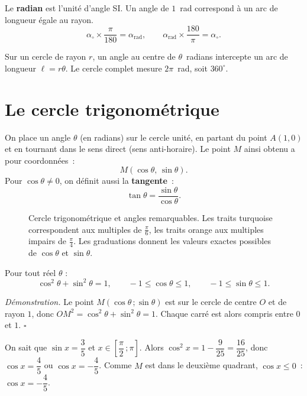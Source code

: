 \begin{defn}[Radian]
Le \textbf{radian} est l'unit\'e d'angle SI. Un angle de $1$~rad correspond
\`a un arc de longueur \'egale au rayon.
$$\alpha_\circ \times \frac{\pi}{180} = \alpha_\text{rad},\qquad
  \alpha_\text{rad} \times \frac{180}{\pi} = \alpha_\circ.$$
\end{defn}

\begin{remarque}
Sur un cercle de rayon $r$, un angle au centre de $\theta$~radians intercepte un
arc de longueur $\ell=r\theta$. Le cercle complet mesure $2\pi$~rad, soit $360^{\circ}$.
\end{remarque}

\section{Le cercle trigonom\'etrique}

\begin{defn}
On place un angle $\theta$ (en radians) sur le cercle unit\'e, en partant
du point $A(1,0)$ et en tournant dans le sens direct (sens anti-horaire).
Le point $M$ ainsi obtenu a pour coordonn\'ees~:
$$M(\cos\theta,\, \sin\theta).$$
Pour $\cos\theta\ne0$, on d\'efinit aussi la \textbf{tangente}~:
$$\tan\theta = \frac{\sin\theta}{\cos\theta}.$$
\end{defn}

\begin{figure}[H]
\centering

\caption{Cercle trigonom\'etrique et angles remarquables. Les traits turquoise
correspondent aux multiples de $\frac{\pi}{6}$, les traits orange aux
multiples impairs de $\frac{\pi}{4}$. Les graduations donnent les valeurs
exactes possibles de $\cos\theta$ et $\sin\theta$.}
\end{figure}

\begin{thm}
Pour tout r\'eel $\theta$ :
$$\cos^2\theta + \sin^2\theta = 1,\qquad -1\leq\cos\theta\leq1,\qquad -1\leq\sin\theta\leq1.$$
\end{thm}

\noindent\textit{D\'emonstration.} Le point $M(\cos\theta\,;\sin\theta)$ est sur le
cercle de centre $O$ et de rayon $1$, donc $OM^2=\cos^2\theta+\sin^2\theta=1$.
Chaque carr\'e est alors compris entre $0$ et $1$. \hfill$\square$

\begin{ex}
On sait que $\sin x=\dfrac35$ et $x\in\left[\dfrac\pi2\,;\pi\right]$.
Alors $\cos^2x=1-\dfrac{9}{25}=\dfrac{16}{25}$, donc $\cos x=\dfrac45$ ou $\cos x=-\dfrac45$.
Comme $M$ est dans le deuxi\`eme quadrant, $\cos x\leq0$~: $\cos x=-\dfrac45$.
\end{ex}

